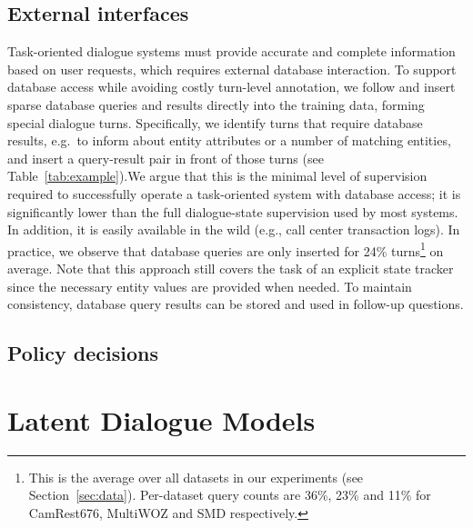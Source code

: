 \subsection{External interfaces}
Task-oriented dialogue systems must provide accurate and complete information based on user requests, which requires external database interaction.
%
To support database access while avoiding costly turn-level annotation,
we follow \citet{bordes2016learning} and 
insert sparse database queries and results directly into the training data, forming special dialogue turns.
Specifically, we identify turns that require database results, e.g.\ to inform about entity attributes or a number of matching entities, and insert a query-result pair in front of those turns (see Table~\ref{tab:example}).We argue that this is the minimal level of supervision required to successfully operate a task-oriented system with database access; it is significantly lower than the full dialogue-state supervision used by most systems.
In addition, it is easily available in the wild (e.g., call center transaction logs).
In practice, we observe that database queries are only inserted for 24\% turns\footnote{This is the average over all datasets in our experiments (see Section~\ref{sec:data}). Per-dataset query counts are 36\%, 23\% and 11\% for CamRest676, MultiWOZ and SMD respectively.} on average.
Note that this approach still covers the task of an explicit state tracker since the necessary entity values are provided when needed.
To maintain consistency, database query results can be stored and used in follow-up questions.

\subsection{Policy decisions}
\section{Latent Dialogue Models}
